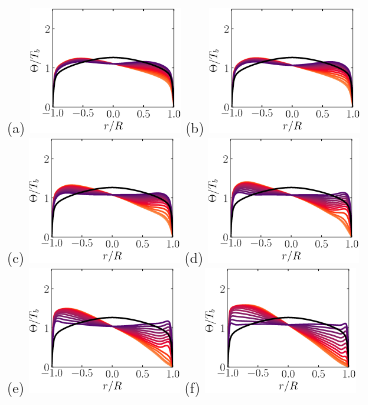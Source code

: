 \documentclass[lineno]{jfm}
\begin{document}
        \begin{figure}
                \centering
		(a) \includegraphics[width=4cm]{Figures/prof_tttb_rotz0_roty0.00390625.eps} 
		(b) \includegraphics[width=4cm]{Figures/prof_tttb_rotz0_roty0.0078125.eps} \\
		(c) \includegraphics[width=4cm]{Figures/prof_tttb_rotz0_roty0.015625.eps}
		(d) \includegraphics[width=4cm]{Figures/prof_tttb_rotz0_roty0.03125.eps} \\
                (e) \includegraphics[width=4cm]{Figures/prof_tttb_rotz0_roty0.0625.eps} 
                (f) \includegraphics[width=4cm]{Figures/prof_tttb_rotz0_roty0.125.eps} \\

\end{figure}
\end{document}
